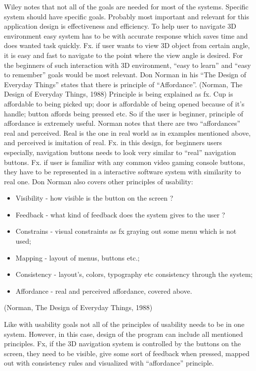 Wiley notes that not all of the goals are needed for most of the systems. 
Specific system should have specific goals. Probably most important and relevant 
for this application design is effectiveness and efficiency. To help user to 
navigate 3D environment easy system has to be with accurate response which saves 
time and does wanted task quickly. Fx. if user wants to view 3D object from 
certain angle, it is easy and fast to navigate to the point where the view angle 
is desired. For the beginners of such interaction with 3D environment, “easy to 
learn” and “easy to remember” goals would be most relevant. Don Norman in his 
“The Design of Everyday Things” states that there is principle of “Affordance”. 
(Norman, The Design of Everyday Things, 1988)  Principle is 
being explained as fx. Cup is affordable to being picked up; door is affordable 
of being opened because of it’s handle; button affords being pressed etc. So if 
the user is beginner, principle of affordance is extremely useful. Norman notes 
that there are two “affordances” real and perceived. Real is the one in real 
world as in examples mentioned above, and perceived is imitation of real. Fx. in 
this design, for beginners users especially, navigation buttons needs to look 
very similar to “real” navigation buttons. Fx. if user is familiar with any 
common video gaming console buttons, they have to be represented in a interactive 
software system with similarity to real one. 
Don Norman also covers other principles of usability:
\begin{itemize}
\item Visibility - how visible is the button on the screen ?
\item Feedback - what kind of feedback does the system gives to the user ?
\item Constrains - visual constraints as fx graying out some menu which is not 
used;
\item Mapping - layout of menus, buttons etc.;
\item Consistency - layout’s, colors, typography etc consistency through the 
system;
\item Affordance  - real and perceived affordance, covered above.
\end{itemize}
(Norman, The Design of Everyday Things, 1988)

Like with usability goals not all of the principles of usability needs to be in 
one system. However, in this case, design of the program can include all 
mentioned principles. Fx, if the 3D navigation system is controlled by the 
buttons on the screen, they need to be visible, give some sort of feedback when 
pressed, mapped out with consistency rules and visualized with “affordance” 
principle. 

